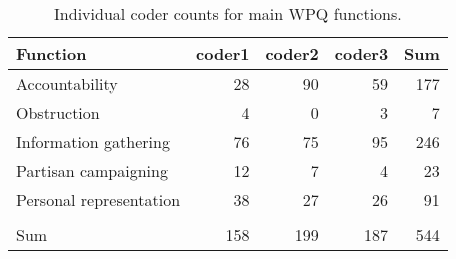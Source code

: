 \documentclass[border=1mm]{standalone}
\begin{document}
\begin{table}
\centering
\caption{\label{tab:tbl-codercounts}Individual coder counts for main WPQ functions.}
\centering
\begin{tabular}[t]{lrr>{}r|r}
\toprule
\textbf{Function} & \textbf{coder1} & \textbf{coder2} & \textbf{coder3} & \textbf{Sum}\\
\midrule
Accountability & 28 & 90 & 59 & 177\\
Obstruction & 4 & 0 & 3 & 7\\
Information gathering & 76 & 75 & 95 & 246\\
Partisan campaigning & 12 & 7 & 4 & 23\\
Personal representation & 38 & 27 & 26 & 91\\
\midrule\\
Sum & 158 & 199 & 187 & 544\\
\bottomrule
\end{tabular}
\end{table}
\end{document}
